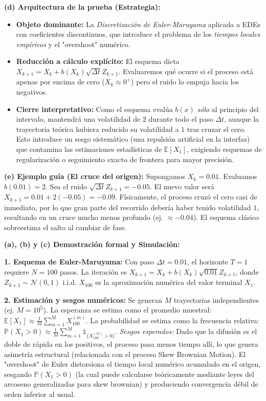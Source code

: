 \documentclass[11pt, letterpaper]{article}
\begin{document}
\begin{solucion}
    \textbf{(d) Arquitectura de la prueba (Estrategia):}
    \begin{itemize}
        \item[(i)] \textbf{Objeto dominante:} La \textit{Discretización de Euler-Maruyama} aplicada a EDEs con coeficientes discontinuos, que introduce el problema de los \textit{tiempos locales empíricos} y el "overshoot" numérico.
        \item[(ii)] \textbf{Reducción a cálculo explícito:} El esquema dicta $X_{k+1} = X_k + b(X_k) \sqrt{\Delta t} Z_{k+1}$. Evaluaremos qué ocurre si el proceso está apenas por encima de cero ($X_k \approx 0^+$) pero el ruido lo empuja hacia los negativos. 
        \item[(iii)] \textbf{Cierre interpretativo:} Como el esquema evalúa $b(x)$ \textit{sólo} al principio del intervalo, mantendrá una volatilidad de $2$ durante todo el paso $\Delta t$, aunque la trayectoria teórica hubiera reducido su volatilidad a $1$ tras cruzar el cero. Esto introduce un sesgo sistemático (una repulsión artificial en la interfaz) que contamina las estimaciones estadísticas de $\mathbb{E}[X_1]$, exigiendo esquemas de regularización o seguimiento exacto de frontera para mayor precisión.
    \end{itemize}

    \vspace{3mm}
    \textbf{(e) Ejemplo guía (El cruce del origen):}
    Supongamos $X_k = 0.01$. Evaluamos $b(0.01) = 2$.
    Sea el ruido $\sqrt{\Delta t} Z_{k+1} = -0.05$. El nuevo valor será $X_{k+1} = 0.01 + 2(-0.05) = -0.09$.
    Físicamente, el proceso cruzó el cero casi de inmediato, por lo que gran parte del recorrido debería haber tenido volatilidad $1$, resultando en un cruce mucho menos profundo (ej. $\approx -0.04$). El esquema clásico sobreestima el salto al cambiar de fase.

    \textbf{(a), (b) y (c) Demostración formal y Simulación:}

    \textbf{1. Esquema de Euler-Maruyama:}
    Con paso $\Delta t = 0.01$, el horizonte $T=1$ requiere $N = 100$ pasos.
    La iteración es $X_{k+1} = X_k + b(X_k) \sqrt{0.01} Z_{k+1}$, donde $Z_{k+1} \sim \mathcal{N}(0,1)$ i.i.d.
    $X_{100}$ es la aproximación numérica del valor terminal $X_1$.

    \textbf{2. Estimación y sesgos numéricos:}
    Se generan $M$ trayectorias independientes (ej. $M = 10^5$).
    La esperanza se estima como el promedio muestral: $\mathbb{E}[X_1] \approx \frac{1}{M} \sum_{m=1}^M X_{100}^{(m)}$.
    La probabilidad se estima como la frecuencia relativa: $\mathbb{P}(X_1 > 0) \approx \frac{1}{M} \sum_{m=1}^M \mathbb{1}_{\{X_{100}^{(m)} > 0\}}$.
    \textit{Sesgos esperados:} Dado que la difusión es el doble de rápida en los positivos, el proceso pasa menos tiempo allí, lo que genera asimetría estructural (relacionada con el proceso Skew Brownian Motion). El "overshoot" de Euler distorsiona el tiempo local numérico acumulado en el origen, sesgando $\mathbb{P}(X_1 > 0)$ (la cual puede calcularse teóricamente mediante leyes del arcoseno generalizadas para skew brownian) y produciendo convergencia débil de orden inferior al usual.


\end{solucion}
\end{document}
